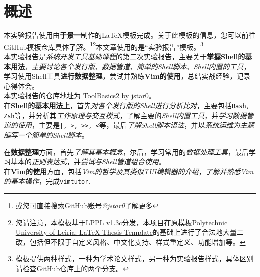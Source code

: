 \thispagestyle{plain} %
\chapter*{概述} %
\label{cp:abstract}

本实验报告使用由\textbf{于景一}制作的\LaTeX{}模板完成。关于此模板的信息，您可以前往\href{https://github.com/jstar0/LaTeXTemplate/}{GitHub模板仓库}具体了解。\footnote{或您可直接搜索GitHub账号\textit{@jstar0}了解更多}\footnote{您请注意，本模板基于LPPL v1.3c分发，本项目在原模板\href{https://github.com/joseareia/ipleiria-thesis}{Polytechnic University of Leiria: LaTeX Thesis Template}的基础上进行了合法地大量二改，包括但不限于自定义风格、中文化支持、样式重定义、功能增加等。}本文章使用的是“实验报告”模板。\footnote{模板提供两种样式，一种为学术论文样式，另一种为实验报告样式，具体区别请检查GitHub仓库上的两个分支。}\\

本实验报告是\textit{系统开发工具基础课程}的第二次实验报告，主要关于\textbf{掌握Shell的基本用法}\textit{，主要讨论各个发行版、数据管道、简单的Shell脚本、Shell内置的工具}，学习使用Shell工具\textbf{进行数据整理}，尝试并熟练\textbf{Vim的使用}，总结实战经验，记录心得体会。\\

本实验报告的仓库地址为 \href{https://github.com/jstar0/ToolBasics2}{ToolBasics2 by jstar0}。\\

在\textbf{Shell的基本用法上}，首先\textit{对各个发行版的Shell进行分析比对}，主要包括\texttt{Bash, Zsh}等，并分析其\textit{工作原理与交互模式}，了解主要的\textit{Shell内置工具}，并\textit{学习数据管道的使用}，主要是\texttt{|, >, >>, <}等，最后\textit{了解Shell脚本语法}，并以\textit{系统运维为主题编写一个简单的Shell脚本}。

在\textbf{数据整理}方面，首先\textit{了解其基本概念}，尔后，学习常用的\textit{数据处理工具}，最后学习基本的\textit{正则表达式}，并\textit{尝试与Shell管道组合使用}。\\

在\textbf{Vim的使用}方面，包括\textit{Vim的哲学及其类似TUI编辑器的介绍}，\textit{了解并熟悉Vim的基本操作}，完成\texttt{vimtutor}.\\

